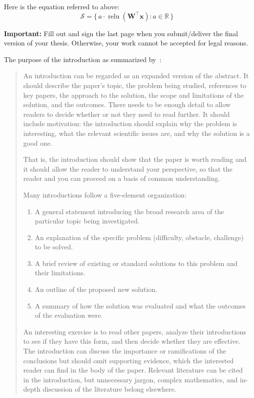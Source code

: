 \documentclass[a4paper,oneside,bibliography=totoc]{scrbook}
\begin{document}
Here is the equation referred to above:
\begin{equation}
  \label{eq:s}
  \mathcal{S}=\{\,a\cdot \operatorname{relu}(\mathbf{W^\top}\mathbf{x}) :
  a\in\mathbb{R} \,\}
\end{equation}

\textbf{Important:} Fill out and sign the last page when you submit/deliver the
final version of your thesis. Otherwise, your work cannot be accepted for legal
reasons.

The purpose of the introduction as summarized by~\citet{zobel2004}:

\blockcquote{zobel2004}{%
  An introduction can be regarded as an expanded version of the abstract. It
  should describe the paper's topic, the problem being studied, references to
  key papers, the approach to the solution, the scope and limitations of the
  solution, and the outcomes. There needs to be enough detail to allow readers
  to decide whether or not they need to read further. It should include
  motivation: the introduction should explain why the problem is interesting,
  what the relevant scientific issues are, and why the solution is a good one.

  That is, the introduction should show that the paper is worth reading and it
  should allow the reader to understand your perspective, so that the reader and
  you can proceed on a basis of common understanding.

  Many introductions follow a five-element organization:
  \begin{enumerate}
  \item A general statement introducing the broad research area of the
    particular topic being investigated.
  \item An explanation of the specific problem (difficulty, obstacle, challenge)
    to be solved.
  \item A brief review of existing or standard solutions to this problem and
    their limitations.
  \item An outline of the proposed new solution.
  \item A summary of how the solution was evaluated and what the outcomes of the
    evaluation were.
  \end{enumerate}

  An interesting exercise is to read other papers, analyze their introductions
  to see if they have this form, and then decide whether they are effective. The
  introduction can discuss the importance or ramifications of the conclusions
  but should omit supporting evidence, which the interested reader can find in
  the body of the paper. Relevant literature can be cited in the introduction,
  but unnecessary jargon, complex mathematics, and in-depth discussion of the
  literature belong elsewhere.

}
\end{document}
